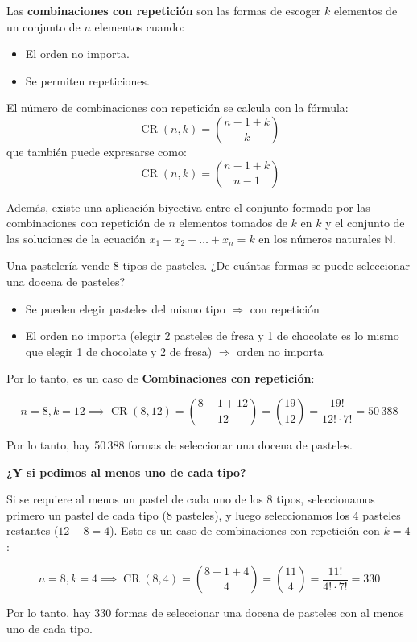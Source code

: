 \documentclass[a4paper,12pt]{article}
\begin{document}
\begin{procedimiento}[title=Definición de combinaciones con repetición]
Las \textbf{combinaciones con repetición} son las formas de escoger $k$ elementos de un conjunto de $n$ elementos cuando:
\begin{itemize}
    \item El orden no importa.
    \item Se permiten repeticiones.
\end{itemize}

El número de combinaciones con repetición se calcula con la fórmula:
\[
\operatorname{CR}(n,k) = \binom{n-1+k}{k}
\]
que también puede expresarse como:
\[
\operatorname{CR}(n,k) = \binom{n-1+k}{n-1}
\]

Además, existe una aplicación biyectiva entre el conjunto formado por las combinaciones con repetición de $n$ elementos tomados de $k$ en $k$ y el conjunto de las soluciones de la ecuación $x_1 + x_2 + \dots + x_n = k$ en los números naturales $\mathbb{N}$.
\end{procedimiento}

\begin{ejemplo}[title=Ejemplo 1: Selección de pasteles]
Una pastelería vende 8 tipos de pasteles. ¿De cuántas formas se puede seleccionar una docena de pasteles?

\begin{itemize}
    \item Se pueden elegir pasteles del mismo tipo $\Rightarrow$ con repetición
    \item El orden no importa (elegir 2 pasteles de fresa y 1 de chocolate es lo mismo que elegir 1 de chocolate y 2 de fresa) $\Rightarrow$ orden no importa
\end{itemize}

Por lo tanto, es un caso de \textbf{Combinaciones con repetición}:

\[
n = 8, k = 12 \implies \operatorname{CR}(8,12) = \binom{8-1+12}{12} = \binom{19}{12} = \frac{19!}{12! \cdot 7!} = 50\,388
\]

Por lo tanto, hay 50\,388 formas de seleccionar una docena de pasteles.

\textbf{¿Y si pedimos al menos uno de cada tipo?}

Si se requiere al menos un pastel de cada uno de los 8 tipos, seleccionamos primero un pastel de cada tipo (8 pasteles), y luego seleccionamos los 4 pasteles restantes ($12 - 8 = 4$). Esto es un caso de combinaciones con repetición con $k = 4$:

\[
n = 8, k = 4 \implies \operatorname{CR}(8,4) = \binom{8-1+4}{4} = \binom{11}{4} = \frac{11!}{4! \cdot 7!}
= 330
\]

Por lo tanto, hay 330 formas de seleccionar una docena de pasteles con al menos uno de cada tipo.
\end{ejemplo}
\end{document}
